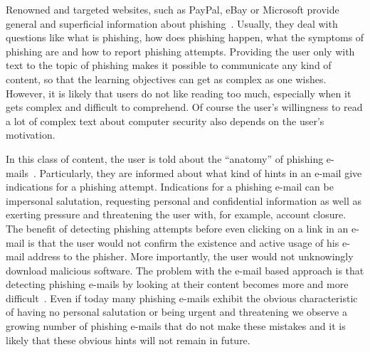 \begin{description}[leftmargin=0cm]
	\item[General Knowledge Transfer] Renowned and targeted websites, such as PayPal, eBay or Microsoft provide general and superficial information about phishing~\cite{generalknowledgemicrosoft, generalknowledgepaypal, generalknowledgeebay}.
	Usually, they deal with questions like what is phishing, how does phishing happen, what the symptoms of phishing are and how to report phishing attempts.
 Providing the user only with text to the topic of phishing makes it possible to communicate any kind of content, so that the learning objectives can get as complex as one wishes.
 However, it is likely that users do not like reading too much, especially when it gets complex and difficult to comprehend.
 Of course the user's willingness to read a lot of complex text about computer security also depends on the user's motivation. 
	\item[E-Mail Based Knowledge] In this class of content, the user is told about the ``anatomy'' of phishing e-mails~\cite{antiphishingphyllis, sonicwall}. Particularly, they are informed about what kind of hints in an e-mail give indications for a phishing attempt.
 Indications for a phishing e-mail can be impersonal salutation, requesting personal and confidential information as well as exerting pressure and threatening the user with, for example, account closure.
 The benefit of detecting phishing attempts before even clicking on a link in an e-mail is that the user would not confirm the existence and active usage of his e-mail address to the phisher.
 More importantly, the user would not unknowingly download malicious software.
 The problem with the e-mail based approach is that detecting phishing e-mails by looking at their content becomes more and more difficult~\cite{microsoftphishing,spamfighter}. Even if today  many phishing e-mails exhibit the obvious characteristic of having no personal salutation or being urgent and threatening we observe a growing number of phishing e-mails that do not make these mistakes and it is likely that these obvious hints will not remain in future.


\end{description}
